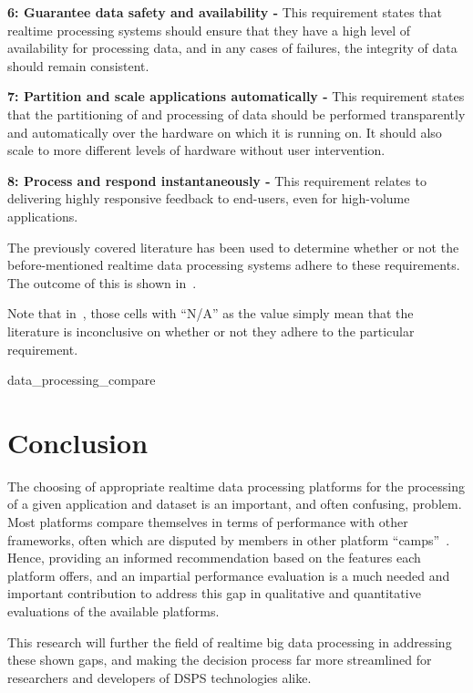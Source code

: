 \noindent \textbf{6: Guarantee data safety and availability -} This requirement states that realtime processing systems
should ensure that they have a high level of availability for processing data, and in any cases of failures, the integrity
of data should remain consistent.

\noindent \textbf{7: Partition and scale applications automatically -} This requirement states that the partitioning of
and processing of data should be performed transparently and automatically over the hardware on which it is running on.
It should also scale to more different levels of hardware without user intervention.

\noindent \textbf{8: Process and respond instantaneously -} This requirement relates to delivering highly responsive
feedback to end-users, even for high-volume applications.

The previously covered literature has been used to determine whether or not the before-mentioned realtime data processing
systems adhere to these requirements. The outcome of this is shown in~.

Note that in~, those cells with ``N/A'' as the value simply mean that the literature
is inconclusive on whether or not they adhere to the particular requirement.

{data_processing_compare}




\section{Conclusion} %
\label{sec:conclusion_litrev}

The choosing of appropriate realtime data processing platforms for the processing of a given application and dataset
is an important, and often confusing, problem. Most platforms compare themselves in terms of performance with other
frameworks, often which are disputed by members in other platform ``camps''~\cite{web_slideshare_b,web_slideshare_a}.
Hence, providing an informed recommendation based on the features each platform offers, and an impartial performance
evaluation is a much needed and important contribution to address this gap in qualitative and quantitative evaluations
of the available platforms.

This research will further the field of realtime big data processing in addressing these shown gaps, and making the
decision process far more streamlined for researchers and developers of DSPS technologies alike.


